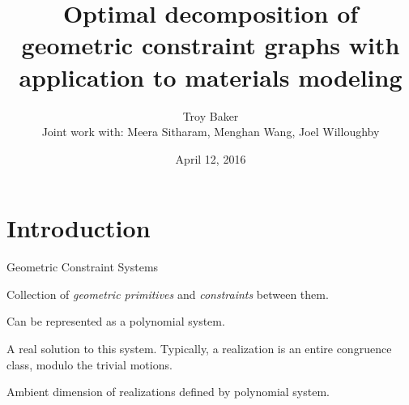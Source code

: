 \documentclass{mySlides}
\title[Optimal\\Decomposition]{Optimal decomposition of geometric constraint graphs with application to materials modeling}
\author[Troy Baker]{Troy Baker\\
\n
\footnotesize Joint work\cite{baker2015optimal} with: Meera Sitharam, Menghan Wang, Joel Willoughby}
\institute{University of Florida}
\date{April 12, 2016}
\newcommand{\n}{\vspace{1em}}
\newcommand{\term}[1]{\textit{#1}}
\begin{document}
\begin{frame}
    \titlepage
\end{frame}


\section{Introduction}
\begin{frame}{Geometric Constraint Systems}
    \begin{definition}
        Collection of \term{geometric primitives} and \term{constraints} between them.
    \end{definition}



    Can be represented as a polynomial system.

    \pause
    \n

    \begin{definition}[Realization]
        A real solution to this system. Typically, a realization is an entire congruence class, modulo the trivial motions.
    \end{definition}
    Ambient dimension of realizations defined by polynomial system.
\end{frame}
\end{document}
